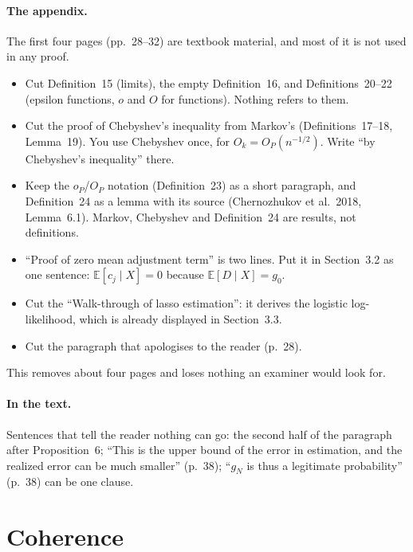 \documentclass[11pt]{article}
\providecommand{\E}{\mathbb{E}}
\theoremstyle{plain}
\theoremstyle{remark}
\begin{document}
\paragraph{The appendix.} The first four pages (pp.~28--32) are textbook
material, and most of it is not used in any proof.
\begin{itemize}
\item Cut Definition~15 (limits), the empty Definition~16, and Definitions~20--22
  (epsilon functions, $o$ and $O$ for functions). Nothing refers to them.
\item Cut the proof of Chebyshev's inequality from Markov's (Definitions~17--18,
  Lemma~19). You use Chebyshev once, for $O_k=O_P(n^{-1/2})$. Write ``by
  Chebyshev's inequality'' there.
\item Keep the $o_P$/$O_P$ notation (Definition~23) as a short paragraph, and
  Definition~24 as a lemma with its source (Chernozhukov et al.\ 2018,
  Lemma~6.1). Markov, Chebyshev and Definition~24 are results, not definitions.
\item ``Proof of zero mean adjustment term'' is two lines. Put it in
  Section~3.2 as one sentence: $\E[c_j\mid X]=0$ because $\E[D\mid X]=g_0$.
\item Cut the ``Walk-through of lasso estimation'': it derives the logistic
  log-likelihood, which is already displayed in Section~3.3.
\item Cut the paragraph that apologises to the reader (p.~28).
\end{itemize}
This removes about four pages and loses nothing an examiner would look for.

\paragraph{In the text.} Sentences that tell the reader nothing can go: the
second half of the paragraph after Proposition~6; ``This is the upper bound of
the error in estimation, and the realized error can be much smaller'' (p.~38);
``$g_N$ is thus a legitimate probability'' (p.~38) can be one clause.

\section{Coherence}\label{sec:coherence}
\end{document}
